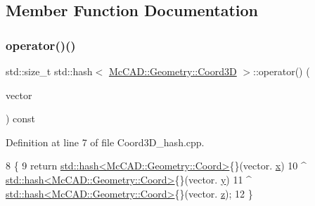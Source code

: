 \subsection{Member Function Documentation}
\mbox{\label{structstd_1_1hash_3_01McCAD_1_1Geometry_1_1Coord3D_01_4_a16275a15b6442e2d77d630a8d72c6da9}} 
\subsubsection{\texorpdfstring{operator()()}{operator()()}\hspace{0.1cm}{\footnotesize\ttfamily [1/2]}}
{\footnotesize\ttfamily std\+::size\+\_\+t std\+::hash$<$ \hyperlink{classMcCAD_1_1Geometry_1_1Coord3D}{Mc\+C\+A\+D\+::\+Geometry\+::\+Coord3D} $>$\+::operator() (\begin{DoxyParamCaption}\item[{const \hyperlink{classMcCAD_1_1Geometry_1_1Coord3D}{Mc\+C\+A\+D\+::\+Geometry\+::\+Coord3D} \&}]{vector }\end{DoxyParamCaption}) const}



Definition at line 7 of file Coord3\+D\+\_\+hash.\+cpp.


\begin{DoxyCode}
8                                                  \{
9     \textcolor{keywordflow}{return} \hyperlink{structstd_1_1hash_3_01McCAD_1_1Geometry_1_1Coord_01_4}{std::hash<McCAD::Geometry::Coord>}\{\}(vector.
      \hyperlink{classMcCAD_1_1Geometry_1_1Coord3D_a82467d541e4e330484b7f4d589b433b4}{x})
10             ^ \hyperlink{structstd_1_1hash_3_01McCAD_1_1Geometry_1_1Coord_01_4}{std::hash<McCAD::Geometry::Coord>}\{\}(vector.
      \hyperlink{classMcCAD_1_1Geometry_1_1Coord3D_af6512434da6e0242b2606e2341abc01d}{y})
11             ^ \hyperlink{structstd_1_1hash_3_01McCAD_1_1Geometry_1_1Coord_01_4}{std::hash<McCAD::Geometry::Coord>}\{\}(vector.
      \hyperlink{classMcCAD_1_1Geometry_1_1Coord3D_a5f89140bda6825a0a21d0064d05d9f4b}{z});
12 \}
\end{DoxyCode}
\mbox{\label{structstd_1_1hash_3_01McCAD_1_1Geometry_1_1Coord3D_01_4_a16275a15b6442e2d77d630a8d72c6da9}} 
